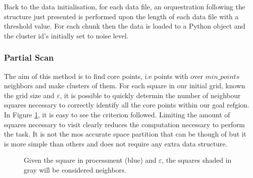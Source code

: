 \documentclass[10pt,journal,compsoc]{IEEEtran}
\let\MYoriglatexcaption\caption
\renewcommand{\caption}[2][\relax]{\MYoriglatexcaption[#2]{#2}}
\begin{document}
Back to the data initialisation, for each data file, an orquestration following the structure just presented is performed upon the length of each data file with a threshold value. For each chunk then the data is loaded to a Python object and the cluster id's initially set to noise level.

\subsubsection{Partial Scan} \label{sec:partial-scan}
The aim of this method is to find core points, i.e points with over $min\_points$ neighbors and make clusters of them. For each square in our initial grid, known the grid size and $\varepsilon$, it is possible to quickly determin the number of neighbour squares necessary to correctly identify all the core points within our goal refgion. In Figure \ref{fig:neigh-loc}, it is easy to see the criterion followed. Limiting the amount of squares necessary to visit clearly reduces the computation necessary to perform the task. It is not the mos accurate space partition that can be though of but it is more simple than others and does not require any extra data structure.

\begin{figure}[!h]
\centering
{}
\caption{Given the square in processment (blue) and $\varepsilon$, the squares shaded in gray will be considered neighbors. \label{fig:neigh-loc}}
\end{figure}
\end{document}
